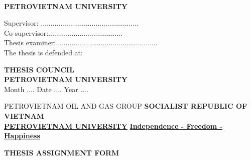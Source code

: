 \documentclass[12pt,a4paper]{report}
\begin{document}



\begin{center}
	\centering
	\\ 
	\textbf{PETROVIETNAM UNIVERSITY}
\end{center}
Supervisor: ..................................................\\
\newline
Co-supervisor:......................................\\
\newline
Thesis examiner:....................................................\\
\newline
\newline
\newline
\newline
\newline
\newline
The thesis is defended at:
\begin{center}
	\centering
	\textbf{THESIS COUNCIL}\\
	\textbf{PETROVIETNAM UNIVERSITY}\\
	Month .... Date .... Year ....
\end{center}


\newpage
\begingroup
\fontsize{10pt}{12pt}\selectfont
PETROVIETNAM OIL AND GAS GROUP \hspace*{1.5cm} \textbf{SOCIALIST REPUBLIC OF VIETNAM}\\
\hspace*{.5cm}\underline{\textbf{PETROVIETNAM UNIVERSITY}} \hspace*{2.4cm} \underline{\textbf{Independence - Freedom - Happiness}}
\endgroup

\begin{center}
	\centering
	\textbf{THESIS ASSIGNMENT FORM}
\end{center}
\end{document}
